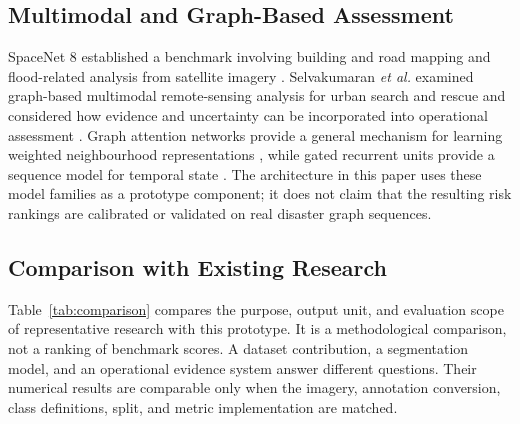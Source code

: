 \documentclass[conference]{IEEEtran}
\newcommand{\changed}[1]{{\color{blue}#1}}
\newcommand{\changed}[1]{#1}
\begin{document}
\subsection{Multimodal and Graph-Based Assessment}
SpaceNet 8 established a benchmark involving building and road mapping and flood-related analysis from satellite imagery \cite{spacenet}. Selvakumaran \emph{et al.} examined graph-based multimodal remote-sensing analysis for urban search and rescue and considered how evidence and uncertainty can be incorporated into operational assessment \cite{selva}. Graph attention networks provide a general mechanism for learning weighted neighbourhood representations \cite{gat}, while gated recurrent units provide a sequence model for temporal state \cite{gru}. The architecture in this paper uses these model families as a prototype component; it does not claim that the resulting risk rankings are calibrated or validated on real disaster graph sequences.


\subsection{Comparison with Existing Research}
\changed{Table~\ref{tab:comparison} compares the purpose, output unit, and evaluation scope of representative research with this prototype. It is a methodological comparison, not a ranking of benchmark scores. A dataset contribution, a segmentation model, and an operational evidence system answer different questions. Their numerical results are comparable only when the imagery, annotation conversion, class definitions, split, and metric implementation are matched.}
\end{document}
